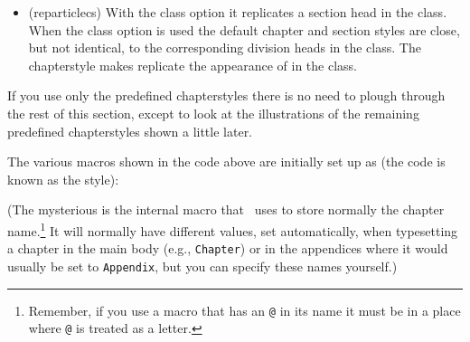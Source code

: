 \begin{itemize}
\item[\cstyle{reparticle}]
\glossary(reparticlecs)%
  {}%
  {With the  class option it replicates a section head in
   the  class.}
   When the  class option is used
    the default chapter and section styles are close, but not
    identical, to the corresponding division heads in the 
    class. The  chapterstyle makes \cmd{\chapter}
    replicate the appearance of \cmd{\section} in the 
    class.

\end{itemize}

    If you use only the predefined chapterstyles there is no need to
plough through the rest of this section, except to look at the illustrations
of the remaining predefined chapterstyles shown a little later.

The various macros shown in the  code above are initially
set up as (the code is known as the  style):
\begin{lcode}
\newcommand{\chapterheadstart}{\vspace*{\beforechapskip}}
\newcommand{\printchaptername}{\chapnamefont \@chapapp}
\newcommand{\chapternamenum}{\space}
\newcommand{\printchapternum}{\chapnumfont \thechapter}
\newcommand{\afterchapternum}{\par\nobreak\vskip \midchapskip}
\newcommand{\printchapternonum}{}
\newcommand{\printchaptertitle}[1]{\chaptitlefont #1}
\newcommand{\afterchaptertitle}{\par\nobreak\vskip \afterchapskip}
\newcommand{\chapnamefont}{\normalfont\huge\bfseries}
\newcommand{\chapnumfont}{\normalfont\huge\bfseries}
\newcommand{\chaptitlefont}{\normalfont\Huge\bfseries}
\setlength{\beforechapskip}{50pt}
\setlength{\midchapskip}{20pt}
\setlength{\afterchapskip}{40pt}
\end{lcode}
(The mysterious \cmd{\@chapapp} is the internal macro that \ltx\ uses
to store normally the chapter name.\footnote{Remember, if you use
a macro that has an \texttt{@} in its name it must be in a place
where \texttt{@} is treated as a letter.} It will normally have
different values,
set automatically, when typesetting a chapter in the main body
(e.g., \texttt{Chapter}) or in the appendices where
it would usually be set to \texttt{Appendix}, but you can specify
these names yourself.)



